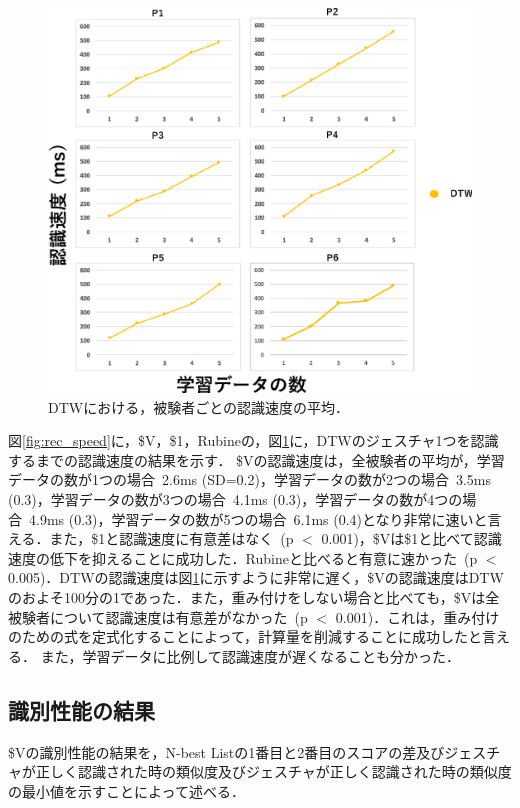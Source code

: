 \begin{figure}[!h]
\centering
\includegraphics[width=1.0\columnwidth]{img/rec_speed_dtw.eps}
\caption{DTWにおける，被験者ごとの認識速度の平均．}
\label{fig:rec_speed_dtw}
\end{figure}

図\ref{fig:rec_speed}に，\$V，\$1，Rubineの，図\ref{fig:rec_speed_dtw}に，DTWのジェスチャ1つを認識するまでの認識速度の結果を示す．
\$Vの認識速度は，全被験者の平均が，学習データの数が1つの場合~2.6ms (SD=0.2)，学習データの数が2つの場合~3.5ms (0.3)，学習データの数が3つの場合~4.1ms (0.3)，学習データの数が4つの場合~4.9ms (0.3)，学習データの数が5つの場合~6.1ms (0.4)となり非常に速いと言える．また，\$1と認識速度に有意差はなく~(p $<$ 0.001)，\$Vは\$1と比べて認識速度の低下を抑えることに成功した．Rubineと比べると有意に速かった~(p $<$ 0.005)．DTWの認識速度は図\ref{fig:rec_speed_dtw}に示すように非常に遅く，\$Vの認識速度はDTWのおよそ100分の1であった．また，重み付けをしない場合と比べても，\$Vは全被験者について認識速度は有意差がなかった~(p $<$ 0.001)．これは，重み付けのための式を定式化することによって，計算量を削減することに成功したと言える．
また，学習データに比例して認識速度が遅くなることも分かった．

\clearpage
\subsection{識別性能の結果}
\$Vの識別性能の結果を，N-best Listの1番目と2番目のスコアの差及びジェスチャが正しく認識された時の類似度及びジェスチャが正しく認識された時の類似度の最小値を示すことによって述べる．

